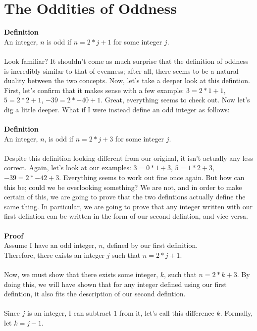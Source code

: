 \documentclass[a4paper,12pt]{article}
\begin{document}
\section{The Oddities of Oddness}
\textbf{Definition}\\
An integer, $n$ is odd if $n = 2*j + 1$ for some integer $j$.\\
\\
Look familiar? It shouldn't come as much surprise that the definition of oddness is incredibly similar to that of evenness; after all, there seems to be a natural duality between the two concepts. Now, let's take a deeper look at this defintion. First, let's confirm that it makes sense with a few example: $3 = 2*1 + 1$, $5 = 2*2 + 1$, $-39 = 2*-40 + 1$. Great, everything seems to check out. Now let's dig a little deeper. What if I were instead define an odd integer as follows:\\
\\
\textbf{Definition}\\
An integer, $n$, is odd if $n = 2*j + 3$ for some integer $j$.\\
\\
Despite this definition looking different from our original, it isn't actually any less correct. Again, let's look at our examples: $3 = 0*1 + 3$, $5 = 1*2 + 3$, $-39 = 2*-42 + 3$. Everything seems to work out fine once again. But how can this be; could we be overlooking something? We are not, and in order to make certain of this, we are going to prove that the two defintions actually define the same thing. In particular, we are going to prove that any integer written with our first defintion can be written in the form of our second defintion, and vice versa.\\
\\
\textbf{Proof}\\
Assume I have an odd integer, $n$, defined by our first definition.\\
Therefore, there exists an integer $j$ such that $n = 2*j + 1$.\\
\\
Now, we must show that there exists some integer, $k$, such that $n = 2*k + 3$. By doing this, we will have shown that for any integer defined using our first defintion, it also fits the description of our second defintion.\\
\\
Since $j$ is an integer, I can subtract $1$ from it, let's call this difference $k$. Formally, let $k = j - 1$.\\
\end{document}
